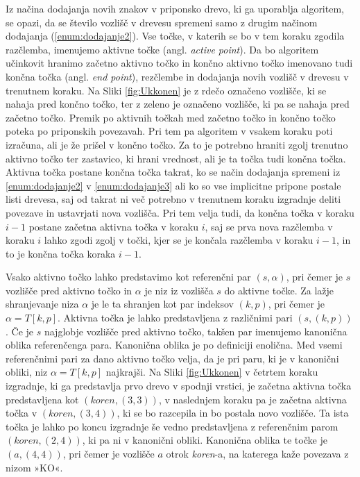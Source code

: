 Iz načina dodajanja novih znakov v priponsko drevo, ki ga uporablja algoritem, se opazi, da se število vozlišč v drevesu spremeni samo z drugim načinom dodajanja (\ref{enum:dodajanje2}). Vse točke, v katerih se bo v tem koraku zgodila razčlemba, imenujemo aktivne točke (angl. \textit{active point}). Da bo algoritem učinkovit hranimo začetno aktivno točko in končno aktivno točko imenovano tudi končna točka (angl. \textit{end point}), rezčlembe in dodajanja novih vozlišč v drevesu v trenutnem koraku. Na Sliki \ref{fig:Ukkonen} je z rdečo označeno vozlišče, ki se nahaja pred končno točko, ter z zeleno je označeno vozlišče, ki pa se nahaja pred začetno točko. Premik po aktivnih točkah med začetno točko in končno točko poteka po priponskih povezavah. Pri tem pa algoritem v vsakem koraku poti izračuna, ali je že prišel v končno točko. Za to je potrebno hraniti zgolj trenutno aktivno točko ter zastavico, ki hrani vrednost, ali je ta točka tudi končna točka. 
Aktivna točka postane končna točka takrat, ko se način dodajanja spremeni iz \ref{enum:dodajanje2} v \ref{enum:dodajanje3} ali ko so vse implicitne pripone postale listi drevesa, saj od takrat ni več potrebno v trenutnem koraku izgradnje deliti povezave in ustavrjati nova vozlišča.
Pri tem velja tudi, da končna točka v koraku $i-1$ postane začetna aktivna točka v koraku $i$, saj se prva nova razčlemba v koraku $i$ lahko zgodi zgolj v točki, kjer se je končala razčlemba v koraku $i-1$, in to je končna točka koraka $i-1$. 

Vsako aktivno točko lahko predstavimo kot referenčni par $(s,\alpha)$, pri čemer je $s$ vozlišče pred aktivno točko in $\alpha$ je niz iz vozlišča $s$ do aktivne točke. Za lažje shranjevanje niza $\alpha$ je le ta shranjen kot par indeksov $(k,p)$, pri čemer je $\alpha=T[k,p]$. Aktivna točka je lahko predstavljena z različnimi pari $(s, (k,p))$. Če je $s$  najglobje vozlišče pred aktivno točko, takšen par imenujemo kanonična oblika referenčenga para. Kanonična oblika je po definiciji enolična. Med vsemi referenčnimi pari za dano aktivno točko velja, da je pri paru, ki je v kanonični obliki, niz $\alpha=T[k,p]$ najkrajši. Na Sliki \ref{fig:Ukkonen} v četrtem koraku izgradnje, ki ga predstavlja prvo drevo v spodnji vrstici, je začetna aktivna točka predstavljena kot $(\textit{koren},(3,3))$, v naslednjem koraku pa je začetna aktivna točka v $(\textit{koren},(3,4))$, ki se bo razcepila in bo postala novo vozlišče. Ta ista točka je lahko po koncu izgradnje še vedno predstavljena z referenčnim parom $(\textit{koren},(2,4))$, ki pa ni v kanonični obliki. Kanonična oblika te točke je $(a,(4,4))$, pri čemer je vozlišče $a$ otrok \textit{koren}-a, na katerega kaže povezava z nizom »KO«.

